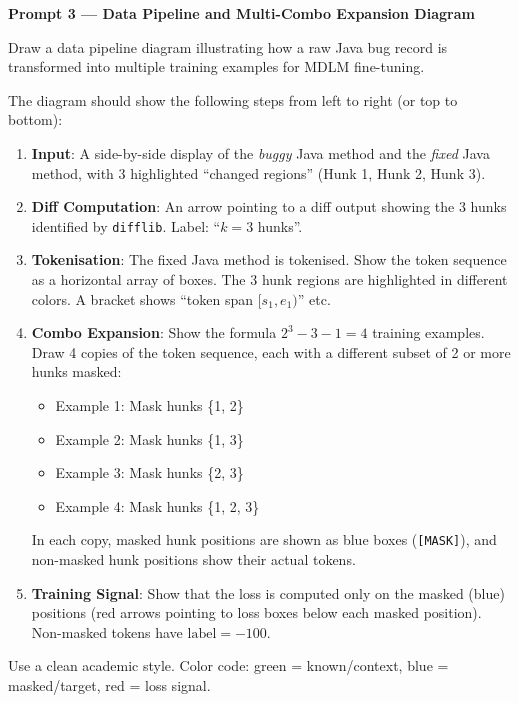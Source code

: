 \documentclass[11pt,a4paper]{article}
\begin{document}
\bigskip

\begin{mdframed}[linecolor=orange!70!black, linewidth=1.2pt, roundcorner=6pt, backgroundcolor=orange!4]
\textbf{Prompt 3 — Data Pipeline and Multi-Combo Expansion Diagram}

\medskip
Draw a data pipeline diagram illustrating how a raw Java bug record is transformed into multiple training examples for MDLM fine-tuning.

The diagram should show the following steps from left to right (or top to bottom):

\begin{enumerate}
  \item \textbf{Input}: A side-by-side display of the \emph{buggy} Java method and the \emph{fixed} Java method, with 3 highlighted ``changed regions'' (Hunk 1, Hunk 2, Hunk 3).
  
  \item \textbf{Diff Computation}: An arrow pointing to a diff output showing the 3 hunks identified by \texttt{difflib}. Label: ``$k = 3$ hunks''.
  
  \item \textbf{Tokenisation}: The fixed Java method is tokenised. Show the token sequence as a horizontal array of boxes. The 3 hunk regions are highlighted in different colors. A bracket shows ``token span $[s_1, e_1)$'' etc.
  
  \item \textbf{Combo Expansion}: Show the formula $2^3 - 3 - 1 = 4$ training examples. Draw 4 copies of the token sequence, each with a different subset of 2 or more hunks masked:
    \begin{itemize}
      \item Example 1: Mask hunks \{1, 2\}
      \item Example 2: Mask hunks \{1, 3\}
      \item Example 3: Mask hunks \{2, 3\}
      \item Example 4: Mask hunks \{1, 2, 3\}
    \end{itemize}
    In each copy, masked hunk positions are shown as blue boxes (\texttt{[MASK]}), and non-masked hunk positions show their actual tokens.
  
  \item \textbf{Training Signal}: Show that the loss is computed only on the masked (blue) positions (red arrows pointing to loss boxes below each masked position). Non-masked tokens have $\text{label} = -100$.
\end{enumerate}

Use a clean academic style. Color code: green = known/context, blue = masked/target, red = loss signal.
\end{mdframed}
\end{document}
